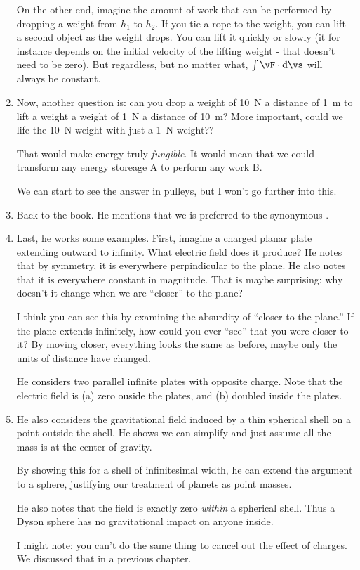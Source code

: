\begin{enumerate}
  On the other end, imagine the amount of work that can be performed by
  dropping a weight from $h_1$ to $h_2$. If you tie a rope to
  the weight, you can lift a second object as the weight drops. You can
  lift it quickly or slowly (it for instance depends on the initial
  velocity of the lifting weight - that doesn't need to be zero). But
  regardless, but no matter what, $\int \vF \cdot \diff{\vs}$ will
  always be constant.

  \item Now, another question is: can you drop a weight of \SI{10}{N} a
  distance of \SI{1}{m} to lift a weight a weight of \SI{1}{N} a
  distance of \SI{10}{m}?  More important, could we life the \SI{10}{N}
  weight with just a \SI{1}{N} weight??

  That would make energy truly \emph{fungible}. It would mean that we
  could transform any energy storeage A to perform any work B.

  We can start to see the answer in pulleys, but I won't go further into
  this.

  \item Back to the book. He mentions that we  is
  preferred to the synonymous .

  \item Last, he works some examples. First, imagine a charged planar
  plate extending outward to infinity. What electric field does it
  produce? He notes that by symmetry, it is everywhere perpindicular to
  the plane. He also notes that it is everywhere constant in magnitude.
  That is maybe surprising: why doesn't it change when we are ``closer''
  to the plane?

  I think you can see this by examining the absurdity of ``closer to the
  plane.'' If the plane extends infinitely, how could you ever ``see''
  that you were closer to it? By moving closer, everything looks the
  same as before, maybe only the units of distance have changed.

  He considers two parallel infinite plates with opposite charge. Note
  that the electric field is (a) zero ouside the plates, and (b) doubled
  inside the plates.

  \item He also considers the gravitational field induced by a thin
  spherical shell on a point outside the shell. He shows we can
  simplify and just assume all the mass is at the center of gravity.

  By showing this for a shell of infinitesimal width, he can extend the
  argument to a sphere, justifying our treatment of planets as point
  masses.

  He also notes that the field is exactly zero \emph{within} a spherical
  shell. Thus a Dyson sphere has no gravitational impact on anyone
  inside.

  I might note: you can't do the same thing to cancel out the effect of
  charges. We discussed that in a previous chapter.
\end{enumerate}
